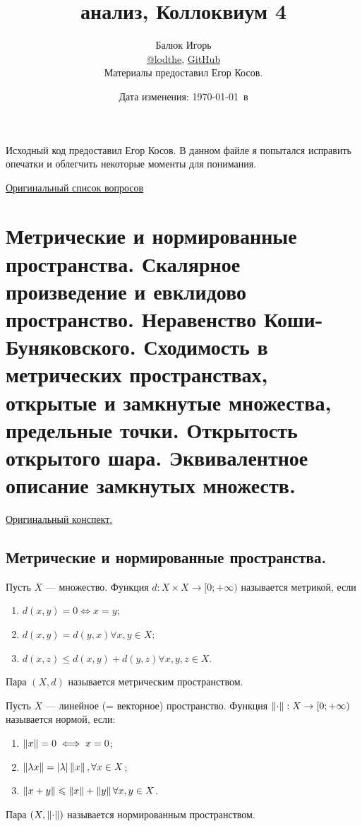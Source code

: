 \documentclass[a4paper]{article}
\title{\HugeМатематический анализ, Коллоквиум 4}
\author{
	Балюк Игорь \\
	\href{https://teleg.run/lodthe}{@lodthe},
    \href{https://github.com/LoDThe/hse-tex}{GitHub} \\
    Материалы предоставил Егор Косов.
}
\date{Дата изменения: \today \ в \currenttime}
\theoremstyle{named}
\begin{document}
    \maketitle

    \tableofcontents

    \newpage

    Исходный код предоставил Егор Косов. В данном файле я попытался исправить опечатки и облегчить некоторые моменты для понимания.

    \href{https://www.dropbox.com/s/fwquqpjo0hnrwn9/%D0%9F%D1%80%D0%BE%D0%B3%D1%80%D0%B0%D0%BC%D0%BC%D0%B0%20%D0%BA%D0%BE%D0%BB%D0%BB%D0%BE%D0%BA%D0%B2%D0%B8%D1%83%D0%BC%D0%B0%20%D0%9C%D0%90-2-2.pdf?dl=0}{Оригинальный список вопросов}

    \section{Метрические и нормированные пространства. Скалярное произведение и евклидово пространство. Неравенство Коши-Буняковского. Сходимость в метрических пространствах, открытые и замкнутые множества, предельные точки. Открытость открытого шара. Эквивалентное описание замкнутых множеств.}

    \href{https://www.dropbox.com/s/donysz87em9jfhs/%D0%9B%D0%B5%D0%BA%D1%86%D0%B8%D1%8F%208.pdf?dl=0}{Оригинальный конспект.}

    \subsection{Метрические и нормированные пространства.}

    \begin{definition*}
        Пусть $X$ --- множество. Функция $d: X \times X \to [0; +\infty)$ называется метрикой, если
        \begin{enumerate}
        \item $d(x, y) = 0 \iff x = y$;
        \item $d(x, y) = d(y, x) \forall x, y \in X$;
        \item $d(x, z) \leq d(x, y) + d(y, z) \forall x, y, z \in X$.
        \end{enumerate}

        Пара $(X, d)$ называется метрическим пространством.
    \end{definition*}

    \begin{definition*}
        Пусть $X$ --- линейное (= векторное) пространство. Функция $\left\lVert\cdot\right\rVert: X \to [0; +\infty)$ называется нормой, если:
        \begin{enumerate}
        \item $\left\lVert x\right\rVert = 0 \iff x = 0$;
        \item $\left\lVert\lambda x\right\rVert = |\lambda| \left\lVert x\right\rVert, \forall x \in X$;
        \item $\left\lVert x + y\right\rVert \leqslant \left\lVert x\right\rVert + \left\lVert y\right\rVert \forall x, y \in X$.
        \end{enumerate}

        Пара $(X, \left\lVert\cdot\right\rVert)$ называется нормированным пространством.
    \end{definition*}
\end{document}
